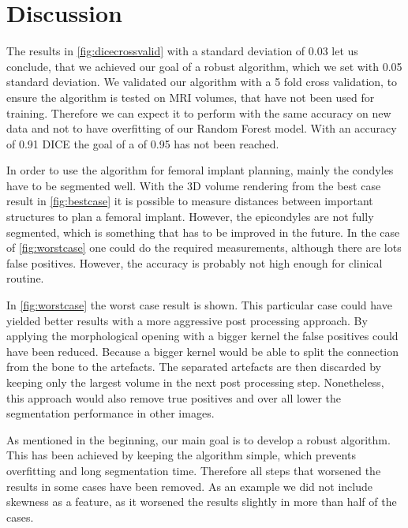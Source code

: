 \section{Discussion}
The results in \autoref{fig:dicecrossvalid} with a standard deviation of 0.03 let us conclude, that we achieved our goal of a robust algorithm, which we set with 0.05 standard deviation. We validated our algorithm with a 5 fold cross validation, to ensure the algorithm is tested on MRI volumes, that have not been used for training. Therefore we can expect it to perform with the same accuracy on new data and not to have overfitting of our Random Forest model. With an accuracy of 0.91 DICE the goal of a of 0.95 has not been reached. 

In order to use the algorithm for femoral implant planning, mainly the condyles have to be segmented well. With the 3D volume rendering from the best case result in \autoref{fig:bestcase} it is possible to measure distances between important structures to plan a femoral implant. However, the epicondyles are not fully segmented, which is something that has to be improved in the future. In the case of \autoref{fig:worstcase} one could do the required measurements, although there are lots false positives. However, the accuracy is probably not high enough for clinical routine.

In \autoref{fig:worstcase} the worst case result is shown. This particular case could have yielded better results with a more aggressive post processing approach. By applying the morphological opening with a bigger kernel the false positives could have been reduced. Because a bigger kernel would be able to split the connection from the bone to the artefacts. The separated artefacts are then discarded by keeping only the largest volume in the next post processing step. Nonetheless, this approach would also remove true positives and over all lower the segmentation performance in other images. 

As mentioned in the beginning, our main goal is to develop a robust algorithm. This has been achieved by keeping the algorithm simple, which prevents overfitting and long segmentation time. Therefore all steps that worsened the results in some cases have been removed. As an example we did not include skewness as a feature, as it worsened the results slightly in more than half of the cases.
